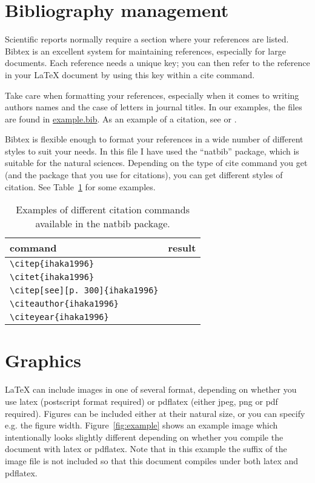 \documentclass{article}
\providecommand*{\latex}{\LaTeX\xspace}
\begin{document}
\section{Bibliography management}

Scientific reports normally require a section where your references
are listed.  Bibtex is an excellent system for maintaining references,
especially for large documents.  Each reference needs a unique key;
you can then refer to the reference in your \latex document by using
this key within a cite command.

Take care when formatting your references, especially when it comes to
writing authors names and the case of letters in journal titles.  In
our examples, the files are found in \url{example.bib}.  As an example
of a citation, see \citep{ihaka1996} or \citep{ihaka1996,venables1999}.

Bibtex is flexible enough to format your references in a wide number
of different styles to suit your needs.  In this file I have used the
``natbib'' package, which is suitable for the natural sciences.
Depending on the type of cite command you get (and the package that
you use for citations), you can get different styles of citation.  See
Table~\ref{tab:cite} for some examples.

\begin{table}
  \centering
  \begin{tabular}{ll}
    \hline
    command & result\\ \hline
    \verb+\citep{ihaka1996}+ & \citep{ihaka1996}\\
    \verb+\citet{ihaka1996}+ & \citet{ihaka1996}\\
    \verb+\citep[see][p. 300]{ihaka1996}+ &
    \citep[see][p. 300]{ihaka1996}
    \\
    \verb+\citeauthor{ihaka1996}+ & \citeauthor{ihaka1996}
    \\
    \verb+\citeyear{ihaka1996}+ & \citeyear{ihaka1996}
    \\
    \hline
  \end{tabular}
  \caption{Examples of different citation commands available in the
    natbib package.}
  \label{tab:cite}
\end{table}


\section{Graphics}
\label{sec:graphics}

\latex can include images in one of several format, depending on
whether you use latex (postscript format required) or pdflatex (either
jpeg, png or pdf required).  Figures can be included either at their
natural size, or you can specify e.g. the figure width.
Figure~\ref{fig:example} shows an example image which intentionally
looks slightly different depending on whether you compile the document
with latex or pdflatex.  Note that in this example the suffix of the
image file is not included so that this document compiles under both
latex and pdflatex.
\end{document}
